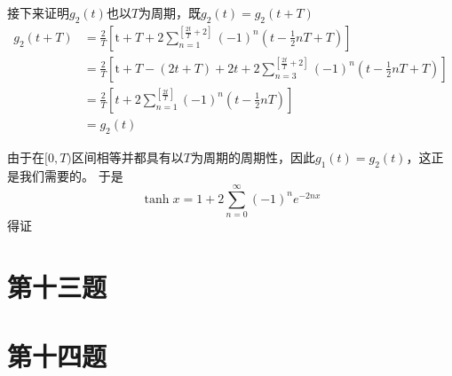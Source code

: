 \documentclass[a4paper]{ctexart}
\begin{document}
接下来证明$g_2(t)$也以$T$为周期，既$g_2(t)=g_2(t+T)$
$$
    \begin{aligned}
        g_2\left( t+T \right)
         & =\frac{2}{T}\left[ \text{t}+T+2\sum_{n=1}^{\left[ \frac{2t}{T}+2 \right]}{\left( -1 \right)}^n\left( t-\frac{1}{2}nT+T \right) \right]                         \\
         & =\frac{2}{T}\left[ \text{t}+T-\left( 2t+T \right) +2t+2\sum_{n=3}^{\left[ \frac{2t}{T}+2 \right]}{\left( -1 \right)}^n\left( t-\frac{1}{2}nT+T \right) \right] \\
         & =\frac{2}{T}\left[ t+2\sum_{n=1}^{\left[ \frac{2t}{T} \right]}{\left( -1 \right)}^n\left( t-\frac{1}{2}nT \right) \right]                                      \\
         & =g_2\left( t \right)
    \end{aligned}
$$

由于在$[0,T)$区间相等并都具有以$T$为周期的周期性，因此$g_1(t)=g_2(t)$，这正是我们需要的。
于是
$$
    \tanh x=1+2 \sum_{n=0}^{\infty}(-1)^{n} e^{-2 n x}
$$
得证


\section{第十三题}
\section{第十四题}
\end{document}
